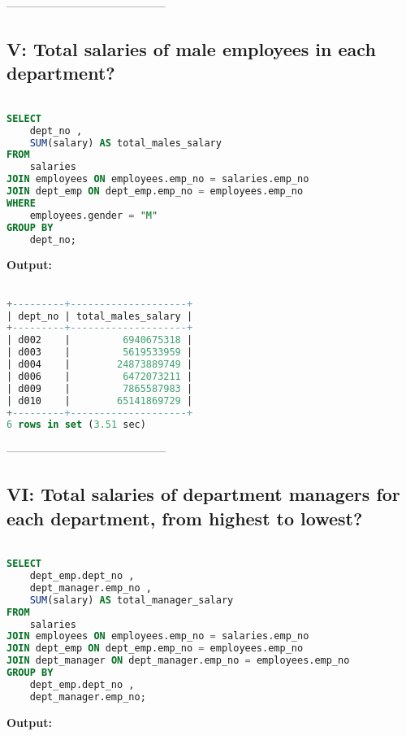 \documentclass[12pt]{report}
\begin{document}
------------------------------------------

\subsection*{V: Total salaries of male employees in each department?}
\begin{lstlisting}[language=sql]

SELECT
	dept_no ,
	SUM(salary) AS total_males_salary
FROM
	salaries
JOIN employees ON employees.emp_no = salaries.emp_no
JOIN dept_emp ON dept_emp.emp_no = employees.emp_no
WHERE
	employees.gender = "M"
GROUP BY
	dept_no;

\end{lstlisting}

\textbf{Output:}

\begin{lstlisting}[language=sql]

+---------+--------------------+
| dept_no | total_males_salary |
+---------+--------------------+
| d002    |         6940675318 |
| d003    |         5619533959 |
| d004    |        24873889749 |
| d006    |         6472073211 |
| d009    |         7865587983 |
| d010    |        65141869729 |
+---------+--------------------+
6 rows in set (3.51 sec)

\end{lstlisting}

------------------------------------------

\subsection*{VI: Total salaries of department managers for each department,
from highest to lowest?}
\begin{lstlisting}[language=sql]

SELECT
	dept_emp.dept_no ,
	dept_manager.emp_no ,
	SUM(salary) AS total_manager_salary
FROM
	salaries
JOIN employees ON employees.emp_no = salaries.emp_no
JOIN dept_emp ON dept_emp.emp_no = employees.emp_no
JOIN dept_manager ON dept_manager.emp_no = employees.emp_no
GROUP BY
	dept_emp.dept_no ,
	dept_manager.emp_no;

\end{lstlisting}

\textbf{Output:}
\end{document}
